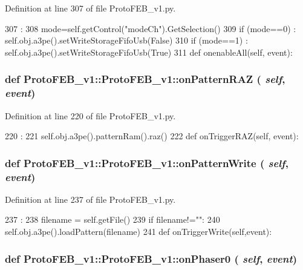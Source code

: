 Definition at line 307 of file ProtoFEB\_\-v1.py.


\begin{DoxyCode}
307                             :
308         mode=self.getControl("modeCh").GetSelection()
309         if (mode==0) : self.obj.a3pe().setWriteStorageFifoUsb(False)
310         if (mode==1) : self.obj.a3pe().setWriteStorageFifoUsb(True)
311 
    def onenableAll(self, event):
\end{DoxyCode}
\hypertarget{classProtoFEB__v1_1_1ProtoFEB__v1_adcd13eb91a6d91a867e7954501318359}{
\subsubsection[{onPatternRAZ}]{\setlength{\rightskip}{0pt plus 5cm}def ProtoFEB\_\-v1::ProtoFEB\_\-v1::onPatternRAZ ( {\em self}, \/   {\em event})}}
\label{classProtoFEB__v1_1_1ProtoFEB__v1_adcd13eb91a6d91a867e7954501318359}


Definition at line 220 of file ProtoFEB\_\-v1.py.


\begin{DoxyCode}
220                                  :
221         self.obj.a3pe().patternRam().raz()
222 
    def onTriggerRAZ(self, event):
\end{DoxyCode}
\hypertarget{classProtoFEB__v1_1_1ProtoFEB__v1_a4e959da1a93010d069005123c49fcf7e}{
\subsubsection[{onPatternWrite}]{\setlength{\rightskip}{0pt plus 5cm}def ProtoFEB\_\-v1::ProtoFEB\_\-v1::onPatternWrite ( {\em self}, \/   {\em event})}}
\label{classProtoFEB__v1_1_1ProtoFEB__v1_a4e959da1a93010d069005123c49fcf7e}


Definition at line 237 of file ProtoFEB\_\-v1.py.


\begin{DoxyCode}
237                                   :
238         filename = self.getFile()
239         if filename!="":
240             self.obj.a3pe().loadPattern(filename)
241 
    def onTriggerWrite(self,event):
\end{DoxyCode}
\hypertarget{classProtoFEB__v1_1_1ProtoFEB__v1_a40ff7b2e1c4b49d4ea6288a58ccab0dd}{
\subsubsection[{onPhaser0}]{\setlength{\rightskip}{0pt plus 5cm}def ProtoFEB\_\-v1::ProtoFEB\_\-v1::onPhaser0 ( {\em self}, \/   {\em event})}}
\label{classProtoFEB__v1_1_1ProtoFEB__v1_a40ff7b2e1c4b49d4ea6288a58ccab0dd}


